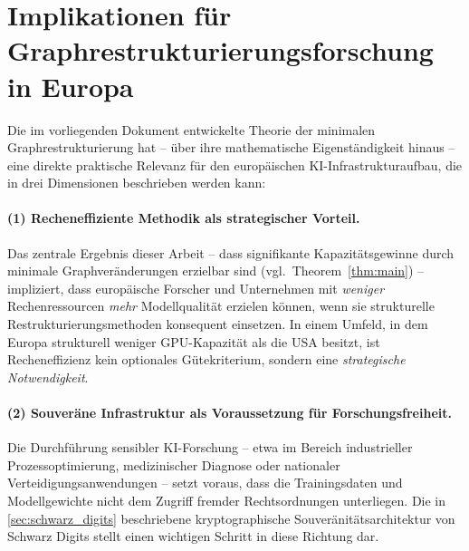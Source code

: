 ﻿\documentclass[12pt, a4paper, openany]{report}
\begin{document}
\section{Implikationen für Graphrestrukturierungsforschung in Europa}
\label{sec:implikationen_graphresearch}

Die im vorliegenden Dokument entwickelte Theorie der minimalen
Graphrestrukturierung hat -- über ihre mathematische Eigenständigkeit
hinaus -- eine direkte praktische Relevanz für den europäischen
KI-Infrastrukturaufbau, die in drei Dimensionen beschrieben werden kann:

\paragraph{(1) Recheneffiziente Methodik als strategischer Vorteil.}
Das zentrale Ergebnis dieser Arbeit -- dass signifikante Kapazitätsgewinne
durch minimale Graphveränderungen erzielbar sind (vgl.\
Theorem~\ref{thm:main}) -- impliziert, dass europäische Forscher und
Unternehmen mit \emph{weniger} Rechenressourcen \emph{mehr} Modellqualität
erzielen können, wenn sie strukturelle Restrukturierungsmethoden konsequent
einsetzen. In einem Umfeld, in dem Europa strukturell weniger
GPU-Kapazität als die USA besitzt, ist Recheneffizienz kein optionales
Gütekriterium, sondern eine \emph{strategische Notwendigkeit}.

\paragraph{(2) Souveräne Infrastruktur als Voraussetzung für Forschungsfreiheit.}
Die Durchführung sensibler KI-Forschung -- etwa im Bereich industrieller
Prozessoptimierung, medizinischer Diagnose oder nationaler
Verteidigungsanwendungen -- setzt voraus, dass die Trainingsdaten und
Modellgewichte nicht dem Zugriff fremder Rechtsordnungen unterliegen.
Die in \cref{sec:schwarz_digits} beschriebene kryptographische
Souveränitätsarchitektur von Schwarz Digits stellt einen wichtigen
Schritt in diese Richtung dar.
\end{document}
